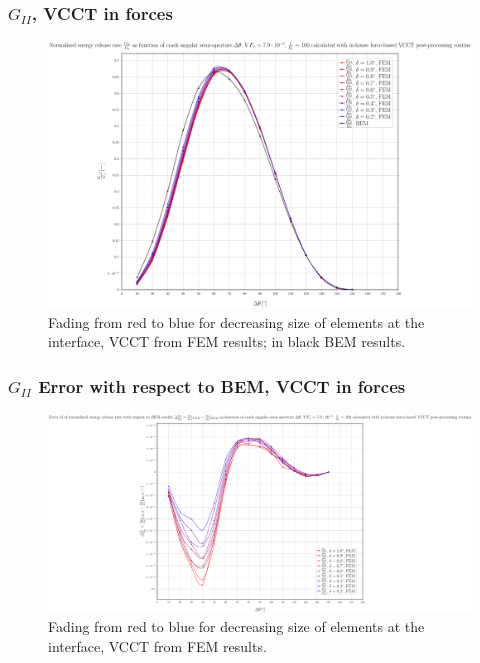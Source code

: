 \documentclass[first,firstsupp,lastsupp,handout,last,hyperref,table]{ETHclass}
\begin{document}
\begin{frame}
\frametitle{\small $G_{II}$, VCCT in forces}
\vspace{-0.5cm}
\centering
\captionsetup[figure]{font=scriptsize,labelfont=scriptsize}
\begin{figure}[!h]
\centering
\includegraphics[height=0.7\textheight]{2017-07-10_AbqRunSummary_SmallStrain_M-F-VCCT_GII.pdf}
  \caption{\scriptsize Fading from red to blue for decreasing size of elements at the interface, VCCT from FEM results; in black BEM results.}
  \label{fig:res1}
\end{figure}
\end{frame}

\begin{frame}
\frametitle{\small $G_{II}$ Error with respect to BEM, VCCT in forces}
\vspace{-0.5cm}
\centering
\captionsetup[figure]{font=scriptsize,labelfont=scriptsize}
\begin{figure}[!h]
\centering
\includegraphics[height=0.7\textheight]{2017-07-10_AbqRunSummary_SmallStrain_M-F-VCCT_GII_ERR.pdf}
  \caption{\scriptsize Fading from red to blue for decreasing size of elements at the interface, VCCT from FEM results.}
  \label{fig:res1}
\end{figure}
\end{frame}
\end{document}
